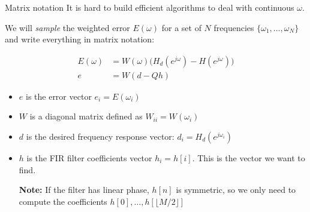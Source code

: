 \documentclass[10pt, aspectratio=169]{beamer}
\begin{document}
\begin{frame}{Matrix notation}
	It is hard to build efficient algorithms to deal with continuous $\omega$.
	
	We will \textit{sample} the weighted error $E(\omega)$ for a set of $N$ frequencies $\{\omega_1, \ldots, \omega_N\}$ and write everything in matrix notation:
	
	\begin{align*}
		E(\omega) &= W(\omega)\Big(H_d(e^{j\omega}) - H(e^{j\omega})\Big) \tag{continuous weighted error} \\
		e &= W(d - Qh) \tag{matrix notation}
	\end{align*}
	
	\begin{itemize}
		\item $e$ is the error vector $e_i = E(\omega_i)$
		\item $W$ is a diagonal matrix defined as $W_{ii} = W(\omega_i)$
		\item $d$ is the desired frequency response vector: $d_i =H_d(e^{j\omega_i})$
		\item $h$ is the FIR filter coefficients vector $h_i = h[i]$. This is the vector we want to find. 
		
		\textbf{Note:} If the filter has linear phase, $h[n]$ is symmetric, so we only need to compute the coefficients $h[0], \ldots, h[\lfloor M/2\rfloor]$
	\end{itemize}
\end{frame}
\end{document}
